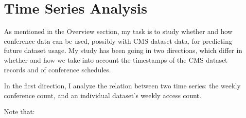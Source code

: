 \documentclass[preprint, 12pt]{elsarticle}
\begin{document}
\section{Time Series Analysis}



As mentioned in the Overview section,
my task is to study whether and how conference data can be used, possibly with CMS dataset data, for predicting future dataset usage.
My study has been going in two directions, which differ in whether and how we take into account the timestamps of the CMS dataset records and of conference schedules.

In the first direction, I analyze the relation between two time series: the weekly conference count, and an individual dataset's weekly access count.

Note that:
\end{document}
